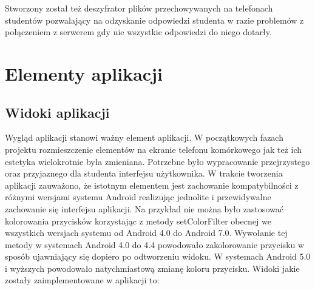 \documentclass{report}
\begin{document}
	Stworzony został też deszyfrator plików przechowywanych na telefonach studentów pozwalający na odzyskanie odpowiedzi studenta w razie problemów z połączeniem z serwerem gdy nie wszystkie odpowiedzi do niego dotarły.
	
	\chapter{Elementy aplikacji}
	
		\section{Widoki aplikacji}
		
		Wygląd aplikacji stanowi ważny element aplikacji. W początkowych fazach projektu rozmieszczenie elementów na ekranie telefonu komórkowego jak też ich estetyka wielokrotnie była zmieniana. Potrzebne było wypracowanie przejrzystego oraz przyjaznego dla studenta interfejsu użytkownika. W trakcie tworzenia aplikacji zauważono, że istotnym elementem jest zachowanie kompatybilności z różnymi wersjami systemu Android realizując jednolite i przewidywalne zachowanie się interfejsu aplikacji.
		Na przykład nie można było zastosować kolorowania przycisków korzystając z metody setColorFilter obecnej we wszystkich wersjach systemu od Android 4.0 do Android 7.0. Wywołanie tej metody w systemach Android 4.0 do 4.4 powodowało zakolorowanie przycisku w sposób ujawniający się dopiero po odtworzeniu widoku. W systemach Android 5.0 i wyższych powodowało natychmiastową zmianę koloru przycisku.
		Widoki jakie zostały zaimplementowane w aplikacji to:
\end{document}
